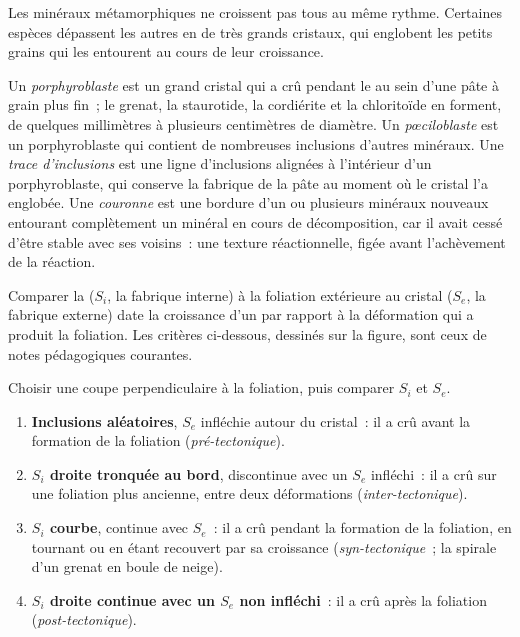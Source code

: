 Les minéraux métamorphiques ne croissent pas tous au même rythme. Certaines espèces dépassent les autres en de très grands cristaux,
qui englobent les petits grains qui les entourent au cours de leur croissance.

\begin{definition}\label{def:b2:field-lab-methods-2:porphyroblast}
Un \emph{porphyroblaste} est un grand cristal qui a crû pendant le 
au sein d'une pâte à grain plus fin~; le grenat, la staurotide, la cordiérite et la chloritoïde en forment, de
quelques millimètres à plusieurs centimètres de diamètre. Un \emph{pœciloblaste} est un
porphyroblaste qui contient de nombreuses inclusions d'autres minéraux. Une \emph{trace
d'inclusions} est une ligne d'inclusions alignées à l'intérieur d'un porphyroblaste, qui
conserve la fabrique de la pâte au moment où le cristal l'a englobée. Une
\emph{couronne} est une bordure d'un ou plusieurs minéraux nouveaux entourant complètement
un minéral en cours de décomposition, car il avait cessé d'être stable avec ses
voisins~: une texture réactionnelle, figée avant l'achèvement de la réaction.
\end{definition}

Comparer la  ($S_i$, la fabrique interne) à la foliation extérieure au cristal
($S_e$, la fabrique externe) date la croissance d'un  par rapport à la déformation qui
a produit la foliation. Les critères ci-dessous, dessinés sur la figure, sont ceux de notes pédagogiques courantes.

\begin{method}\label{met:b2:field-lab-methods-2:timing}
Choisir une coupe perpendiculaire à la foliation, puis comparer $S_i$ et $S_e$.
\begin{enumerate}
  \item \textbf{Inclusions aléatoires}, $S_e$ infléchie autour du cristal~: il a crû avant la
        formation de la foliation (\emph{pré-tectonique}).
  \item \textbf{$S_i$ droite tronquée au bord}, discontinue avec un $S_e$ infléchi~: il a crû
        sur une foliation plus ancienne, entre deux déformations (\emph{inter-tectonique}).
  \item \textbf{$S_i$ courbe}, continue avec $S_e$~: il a crû pendant la formation de la foliation, en tournant
        ou en étant recouvert par sa croissance (\emph{syn-tectonique}~; la spirale d'un grenat en boule de neige).
  \item \textbf{$S_i$ droite continue avec un $S_e$ non infléchi}~: il a crû après la foliation
        (\emph{post-tectonique}).
\end{enumerate}
\end{method}

